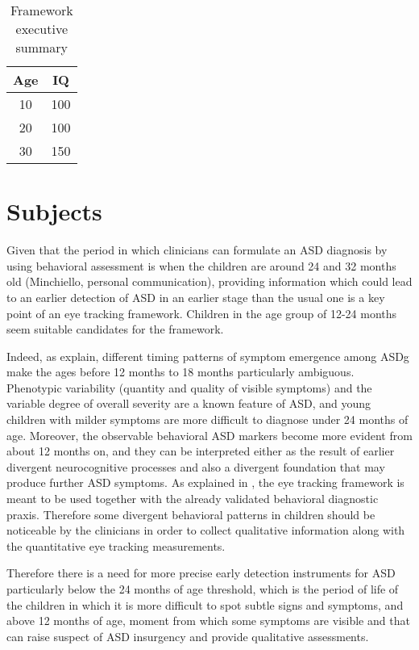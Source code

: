 \begin{table}[tbp]
  \centering
  \begin{tabular}{c|c}
    Age  & IQ  \\ 
    \hline
    10   & 100 \\
    20   & 100 \\
    30   & 150
  \end{tabular}
  \caption{Framework executive summary}
  \label{tab:frameworksummary}
\end{table}


\section{Subjects}
\label{sec:fwksubjects}

Given that the period in which clinicians can formulate an ASD diagnosis by using behavioral assessment is when the children are around 24 and 32 months old (Minchiello, personal communication), providing information which could lead to an earlier detection of ASD in an earlier stage than the usual one is a key point of an eye tracking framework. Children in the age group of 12-24 months seem suitable candidates for the framework.

Indeed, as \cite{towie2016screening} explain, different timing patterns of symptom emergence among ASDg make the ages before 12 months to 18 months particularly ambiguous. Phenotypic variability (quantity and quality of visible symptoms) and the variable degree of overall severity are a known feature of ASD, and young children with milder symptoms are more difficult to diagnose under 24 months of age. Moreover, the observable behavioral ASD markers become more evident from about 12 months on, and they can be interpreted either as the result of earlier divergent neurocognitive processes and also a divergent foundation that may produce further ASD symptoms. As explained in , the eye tracking framework is meant to be used together with the already validated behavioral diagnostic praxis. Therefore some divergent behavioral patterns in children should be noticeable by the clinicians in order to collect qualitative information along with the quantitative eye tracking measurements.

Therefore there is a need for more precise early detection instruments for ASD particularly below the 24 months of age threshold, which is the period of life of the children in which it is more difficult to spot subtle signs and symptoms, and above 12 months of age, moment from which some symptoms are visible and that can raise suspect of ASD insurgency and provide qualitative assessments.

